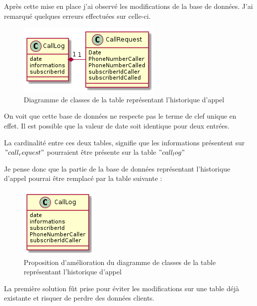 Après cette mise en place j'ai observé les modifications de la base de données. J'ai remarqué quelques erreurs effectuées sur celle-ci.

\newpage
\begin{figure}[!h]
	\centering
	\includegraphics[scale=1]{img/classeCallLogOld.png}
	\caption{\label{class_callLog_old} Diagramme de classes de la table représentant l'historique d'appel}
\end{figure}

On voit que cette base de données ne respecte pas le terme de clef unique en effet. Il est possible que la valeur de date soit identique pour deux entrées.

La cardinalité entre ces deux tables, signifie que les informations présentent sur $"call_request"$ pourraient être présente sur la table $"call_log"$

Je pense donc que la partie de la base de données représentant l'historique d'appel pourrai être remplacé par la table suivante :

\begin{figure}[!h]
	\centering
	\includegraphics[scale=1]{img/classeCallLogNew.png}
	\caption{\label{class_callLog_new} Proposition d'amélioration du diagramme de classes de la table représentant l'historique d'appel}
\end{figure}

La première solution fût prise pour éviter les modifications sur une table déjà existante et risquer de perdre des données clients. 